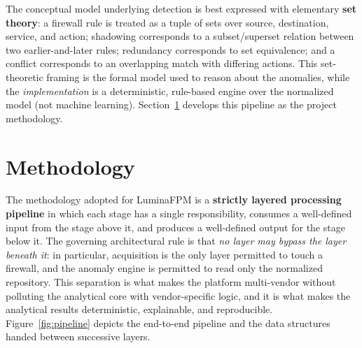 \documentclass[12pt,a4paper]{report}
\renewcommand{\_}{\textunderscore\allowbreak}
\begin{document}
The conceptual model underlying detection is best expressed with elementary \textbf{set theory}: a firewall rule is treated as a tuple of sets over source, destination, service, and action; shadowing corresponds to a subset/superset relation between two earlier-and-later rules; redundancy corresponds to set equivalence; and a conflict corresponds to an overlapping match with differing actions. This set-theoretic framing is the formal model used to reason about the anomalies, while the \emph{implementation} is a deterministic, rule-based engine over the normalized model (not machine learning). Section~\ref{sec:ch3-methodology} develops this pipeline as the project methodology.

\section{Methodology}
\label{sec:ch3-methodology}

The methodology adopted for LuminaFPM is a \textbf{strictly layered processing pipeline} in which each stage has a single responsibility, consumes a well-defined input from the stage above it, and produces a well-defined output for the stage below it. The governing architectural rule is that \emph{no layer may bypass the layer beneath it}: in particular, acquisition is the only layer permitted to touch a firewall, and the anomaly engine is permitted to read only the normalized repository. This separation is what makes the platform multi-vendor without polluting the analytical core with vendor-specific logic, and it is what makes the analytical results deterministic, explainable, and reproducible. Figure~\ref{fig:pipeline} depicts the end-to-end pipeline and the data structures handed between successive layers.
\end{document}
